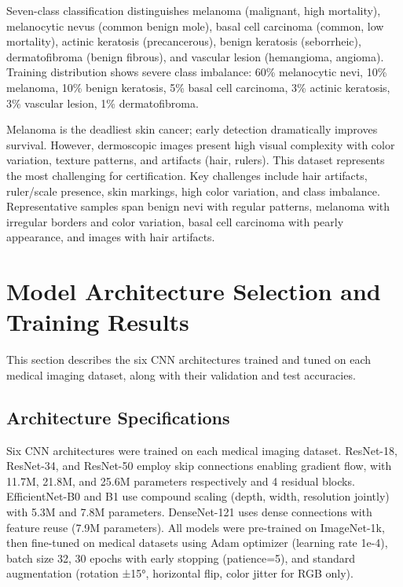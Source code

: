 \documentclass[11pt]{article}
\begin{document}
Seven-class classification distinguishes melanoma (malignant, high mortality), melanocytic nevus (common benign mole), basal cell carcinoma (common, low mortality), actinic keratosis (precancerous), benign keratosis (seborrheic), dermatofibroma (benign fibrous), and vascular lesion (hemangioma, angioma). Training distribution shows severe class imbalance: 60\% melanocytic nevi, 10\% melanoma, 10\% benign keratosis, 5\% basal cell carcinoma, 3\% actinic keratosis, 3\% vascular lesion, 1\% dermatofibroma.

Melanoma is the deadliest skin cancer; early detection dramatically improves survival. However, dermoscopic images present high visual complexity with color variation, texture patterns, and artifacts (hair, rulers). This dataset represents the most challenging for certification. Key challenges include hair artifacts, ruler/scale presence, skin markings, high color variation, and class imbalance. Representative samples span benign nevi with regular patterns, melanoma with irregular borders and color variation, basal cell carcinoma with pearly appearance, and images with hair artifacts.

\newpage

\section{Model Architecture Selection and Training Results}

This section describes the six CNN architectures trained and tuned on each medical imaging dataset, along with their validation and test accuracies.

\subsection{Architecture Specifications}

Six CNN architectures were trained on each medical imaging dataset. ResNet-18, ResNet-34, and ResNet-50 employ skip connections enabling gradient flow, with 11.7M, 21.8M, and 25.6M parameters respectively and 4 residual blocks. EfficientNet-B0 and B1 use compound scaling (depth, width, resolution jointly) with 5.3M and 7.8M parameters. DenseNet-121 uses dense connections with feature reuse (7.9M parameters). All models were pre-trained on ImageNet-1k, then fine-tuned on medical datasets using Adam optimizer (learning rate 1e-4), batch size 32, 30 epochs with early stopping (patience=5), and standard augmentation (rotation ±15°, horizontal flip, color jitter for RGB only).
\end{document}
